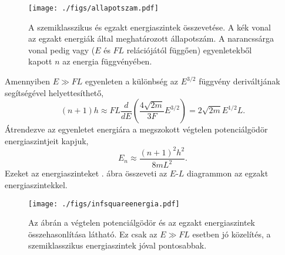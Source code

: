 \begin{figure}[H]
	\centering
	\texttt{[image: ./figs/allapotszam.pdf]}
	\caption[Szemiklasszikus állapotszám]{A szemiklasszikus és egzakt energiaszintek összevetése. A kék vonal az egzakt energiák által meghatározott állapotszám. A narancssárga vonal pedig  vagy  ($E$ és $FL$ relációjától függően) egyenletekből kapott $n$ az energia függvényében.}
	\label{semiclassicallevels:allapotszam}
\end{figure}
Amennyiben $E \gg FL$  egyenleten a különbség az $E^{3/2}$ függvény deriváltjának segítségével helyettesíthető,
\begin{equation}
	(n+1)h \approx FL\frac{d}{dE}\left(\frac{4\sqrt{2m}}{3F}E^{3/2}\right)=2\sqrt{2m}E^{1/2}L.
\end{equation}
Átrendezve az egyenletet energiára a megszokott végtelen potenciálgödör energiaszintjeit kapjuk,
\begin{equation}
	E_n \approx \frac{(n+1)^2h^2}{8mL^2}.
	\label{semiclassicallevels:squarewell}
\end{equation}
Ezeket az energiaszinteket . ábra összeveti az $E$-$L$ diagrammon az egzakt energiaszintekkel.
\begin{figure}[H]
	\centering
	\texttt{[image: ./figs/infsquareenergia.pdf]}
	\caption[Végtelen potenciálgödör energiaszintjei]{Az ábrán a végtelen potenciálgödör és az egzakt energiaszintek összehasonlítása látható. Ez csak az $E \gg FL$ esetben jó közelítés, a szemiklasszikus energiaszintek jóval pontosabbak.}
	\label{semiclassicallevels:squarewell}
\end{figure}